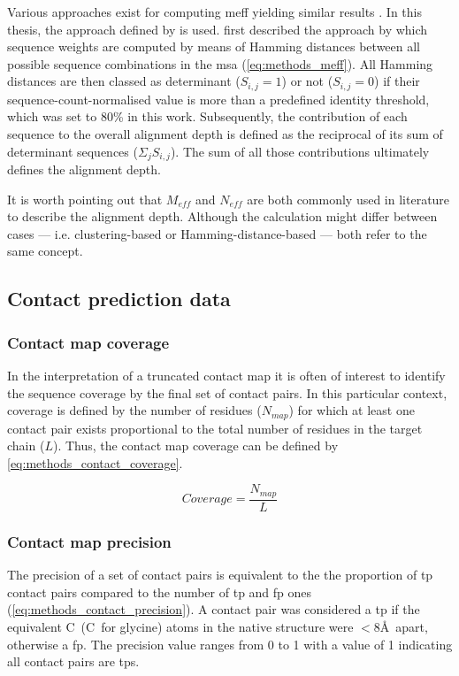 Various approaches exist for computing \gls{meff} \cite{Morcos2011-lk,Jones2012-ks,Jones2015-vq} yielding similar results \cite{Skwark2014-qp}. In this thesis, the approach defined by \textcite{Morcos2011-lk} is used. \textcite{Morcos2011-lk} first described the approach by which sequence weights are computed by means of Hamming distances between all possible sequence combinations in the \gls{msa} (\cref{eq:methods_meff}). All Hamming distances are then classed as determinant ($S_{i,j}=1$) or not ($S_{i,j}=0$) if their sequence-count-normalised value is more than a predefined identity threshold, which was set to 80\% in this work. Subsequently, the contribution of each sequence to the overall alignment depth is defined as the reciprocal of its sum of determinant sequences ($\Sigma_{j} S_{i,j}$). The sum of all those contributions ultimately defines the alignment depth.

It is worth pointing out that $M_{eff}$ and $N_{eff}$ are both commonly used in literature to describe the alignment depth. Although the calculation might differ between cases --- i.e. clustering-based or Hamming-distance-based --- both refer to the same concept.

\subsection{Contact prediction data}
\subsubsection{Contact map coverage}
In the interpretation of a truncated contact map it is often of interest to identify the sequence coverage by the final set of contact pairs. In this particular context, coverage is defined by the number of residues ($N_{map}$) for which at least one contact pair exists proportional to the total number of residues in the target chain ($L$). Thus, the contact map coverage can be defined by \cref{eq:methods_contact_coverage}.

\begin{equation}
    Coverage=\frac{N_{map}}{L}
    \label{eq:methods_contact_coverage}
\end{equation}

\subsubsection{Contact map precision} \label{sec:methods_contact_map_prec} 
The precision of a set of contact pairs is equivalent to the the proportion of \gls{tp} contact pairs compared to the number of \gls{tp} and \gls{fp} ones (\cref{eq:methods_contact_precision}). A contact pair was considered a \gls{tp} if the equivalent C\textbeta\ (C\textalpha\ for glycine) atoms in the native structure were $<8$\AA\ apart, otherwise a \gls{fp}. The precision value ranges from 0 to 1 with a value of 1 indicating all contact pairs are \gls{tp}s. 

